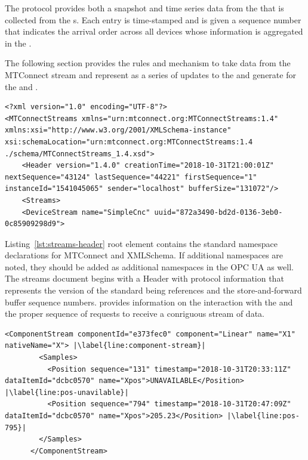 The  protocol provides both a snapshot and time series data from the  that is collected from the s. Each entry is time-stamped and is given a sequence number that indicates the arrival order across all devices whose information is aggregated in the .

The following section provides the rules and mechanism to take data from the MTConnect stream and represent as a series of updates to the  and generate  for the  and .

\begin{lstlisting}[firstnumber=1,escapechar=|,%
    caption={Streams Header},label={lst:streams-header}]
<?xml version="1.0" encoding="UTF-8"?>
<MTConnectStreams xmlns="urn:mtconnect.org:MTConnectStreams:1.4" xmlns:xsi="http://www.w3.org/2001/XMLSchema-instance" xsi:schemaLocation="urn:mtconnect.org:MTConnectStreams:1.4 ./schema/MTConnectStreams_1.4.xsd">
	<Header version="1.4.0" creationTime="2018-10-31T21:00:01Z" nextSequence="43124" lastSequence="44221" firstSequence="1" instanceId="1541045065" sender="localhost" bufferSize="131072"/>
	<Streams>
    <DeviceStream name="SimpleCnc" uuid="872a3490-bd2d-0136-3eb0-0c85909298d9">    
\end{lstlisting}

Listing~\ref{lst:streams-header} root element  contains the standard namespace declarations for MTConnect and XMLSchema. If additional namespaces are noted, they should be added as additional namespaces in the OPC UA  as well. The streams document begins with a Header with protocol information that represents the version of the standard being references and the store-and-forward buffer sequence numbers. \cite{MTCPart1} provides information on the interaction with the  and the proper sequence of requests to receive a conriguous stream of data.

\begin{lstlisting}[firstnumber=last,escapechar=|,%
    caption={Component Stream},label={lst:component-stream}]
      <ComponentStream componentId="e373fec0" component="Linear" name="X1" nativeName="X"> |\label{line:component-stream}|
        <Samples>
          <Position sequence="131" timestamp="2018-10-31T20:33:11Z" dataItemId="dcbc0570" name="Xpos">UNAVAILABLE</Position> |\label{line:pos-unavilable}|
          <Position sequence="794" timestamp="2018-10-31T20:47:09Z" dataItemId="dcbc0570" name="Xpos">205.23</Position> |\label{line:pos-795}|
        </Samples>
      </ComponentStream>
\end{lstlisting}

